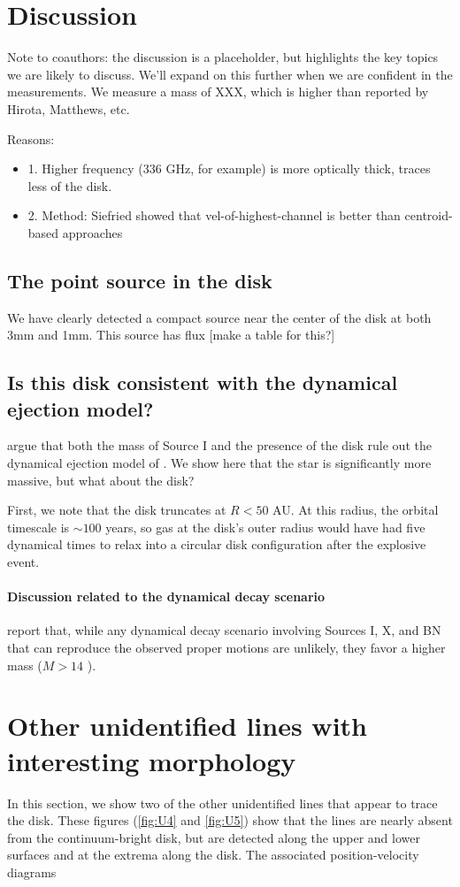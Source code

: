 \documentclass[twocolumn]{aastex61}
\begin{document}
\section{Discussion}
{\color{red} Note to coauthors: the discussion is a placeholder, but highlights
the key topics we are likely to discuss.  We'll expand on this further when
we are confident in the measurements.}
We measure a mass of XXX, which is higher than reported by Hirota, Matthews, etc.

Reasons:
\begin{itemize}
    \item1. Higher frequency (336 GHz, for example) is more optically thick, traces less
of the disk.
\item2. Method: Siefried showed that vel-of-highest-channel is better than centroid-based
approaches
\end{itemize}

\subsection{The point source in the disk}
\label{sec:ptsrc}
We have clearly detected a compact source near the center of the disk
at both 3mm and 1mm.  This source has flux [make a table for this?]

\subsection{Is this disk consistent with the dynamical ejection model?}
\citet{Plambeck2016a} argue that both the mass of Source I and the presence of the disk
rule out the dynamical ejection model of \citet{Bally2011a}.  We show here that
the star is significantly more massive, but what about the disk?

First, we note that the disk truncates at $R<50$ AU.  At this radius, the
orbital timescale is $\sim100$ years, so gas at the disk's outer radius would
have had five dynamical times to relax into a circular disk configuration after the
explosive event.

\paragraph{Discussion related to the dynamical decay scenario}
\citep{Farias2017a} report that, while any dynamical decay scenario
involving Sources I, X, and BN that can reproduce the observed 
proper motions are unlikely, they favor a higher mass ($M>14$ \msun).



\appendix
\section{Other unidentified lines with interesting morphology}
In this section, we show two of the other unidentified lines that appear to trace
the disk.  These figures (\ref{fig:U4} and \ref{fig:U5}) show that the lines
are nearly absent from the continuum-bright disk, but are detected along the upper and
lower surfaces and at the extrema along the disk.  The associated position-velocity diagrams
\end{document}
